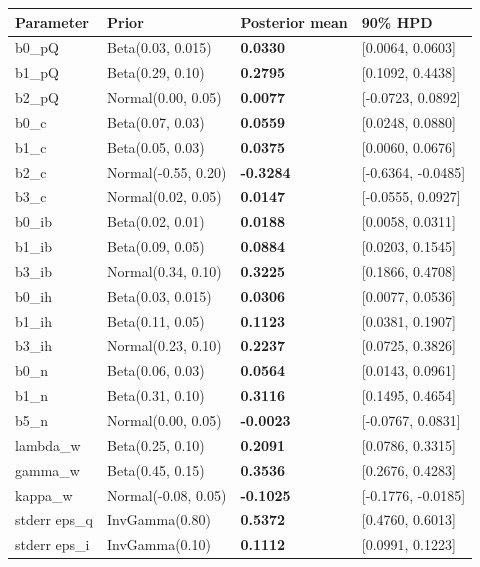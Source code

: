 \documentclass[
]{article}
\newcounter{none} %
\begin{document}
{\def\LTcaptype{none} %
\begin{longtable}[]{@{}llll@{}}
\toprule\noalign{}
Parameter & Prior & Posterior mean & 90\% HPD \\
\midrule\noalign{}
\endhead
\bottomrule\noalign{}
\endlastfoot
b0\_pQ & Beta(0.03, 0.015) & \textbf{0.0330} & {[}0.0064, 0.0603{]} \\
b1\_pQ & Beta(0.29, 0.10) & \textbf{0.2795} & {[}0.1092, 0.4438{]} \\
b2\_pQ & Normal(0.00, 0.05) & \textbf{0.0077} & {[}-0.0723, 0.0892{]} \\
b0\_c & Beta(0.07, 0.03) & \textbf{0.0559} & {[}0.0248, 0.0880{]} \\
b1\_c & Beta(0.05, 0.03) & \textbf{0.0375} & {[}0.0060, 0.0676{]} \\
b2\_c & Normal(-0.55, 0.20) & \textbf{-0.3284} & {[}-0.6364,
-0.0485{]} \\
b3\_c & Normal(0.02, 0.05) & \textbf{0.0147} & {[}-0.0555, 0.0927{]} \\
b0\_ib & Beta(0.02, 0.01) & \textbf{0.0188} & {[}0.0058, 0.0311{]} \\
b1\_ib & Beta(0.09, 0.05) & \textbf{0.0884} & {[}0.0203, 0.1545{]} \\
b3\_ib & Normal(0.34, 0.10) & \textbf{0.3225} & {[}0.1866, 0.4708{]} \\
b0\_ih & Beta(0.03, 0.015) & \textbf{0.0306} & {[}0.0077, 0.0536{]} \\
b1\_ih & Beta(0.11, 0.05) & \textbf{0.1123} & {[}0.0381, 0.1907{]} \\
b3\_ih & Normal(0.23, 0.10) & \textbf{0.2237} & {[}0.0725, 0.3826{]} \\
b0\_n & Beta(0.06, 0.03) & \textbf{0.0564} & {[}0.0143, 0.0961{]} \\
b1\_n & Beta(0.31, 0.10) & \textbf{0.3116} & {[}0.1495, 0.4654{]} \\
b5\_n & Normal(0.00, 0.05) & \textbf{-0.0023} & {[}-0.0767, 0.0831{]} \\
lambda\_w & Beta(0.25, 0.10) & \textbf{0.2091} & {[}0.0786, 0.3315{]} \\
gamma\_w & Beta(0.45, 0.15) & \textbf{0.3536} & {[}0.2676, 0.4283{]} \\
kappa\_w & Normal(-0.08, 0.05) & \textbf{-0.1025} & {[}-0.1776,
-0.0185{]} \\
stderr eps\_q & InvGamma(0.80) & \textbf{0.5372} & {[}0.4760,
0.6013{]} \\
stderr eps\_i & InvGamma(0.10) & \textbf{0.1112} & {[}0.0991,
0.1223{]} \\

\end{longtable}}
\end{document}
